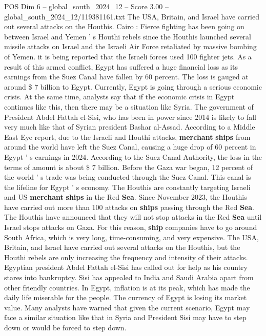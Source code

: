 \begin{textsample}{POS Dim 6 – global\_south\_2024\_12 – Score 3.00 – global\_south\_2024\_12/119381161.txt}  \label{ex:f6_pos_434}
The USA, Britain, and Israel have carried out several attacks on the Houthis.
Cairo : Fierce fighting has been going on between Israel and Yemen ' s Houthi rebels since the Houthis launched several missile attacks on Israel and the Israeli Air Force retaliated by massive bombing of Yemen. it is being reported that the Israeli forces used 100 fighter jets.
As a result of this armed conflict, Egypt has suffered a huge financial loss as its earnings from the Suez Canal have fallen by 60 percent.
The loss is gauged at around \$ 7 billion to Egypt.
Currently, Egypt is going through a serious economic crisis.
At the same time, analysts say that if the economic crisis in Egypt continues like this, then there may be a situation like Syria.
The government of President Abdel Fattah el-Sisi, who has been in power since 2014 is likely to fall very much like that of Syrian president Bashar al-Assad.
According to a Middle East Eye report, due to the Israeli and Houthi attacks, \textbf{merchant} \textbf{ships} from around the world have left the Suez Canal, causing a huge drop of 60 percent in Egypt ' s earnings in 2024.
According to the Suez Canal Authority, the loss in the terms of amount is about \$ 7 billion.
Before the Gaza war began, 12 percent of the world ' s trade was being conducted through the Suez Canal.
This canal is the lifeline for Egypt ' s economy.
The Houthis are constantly targeting Israeli and US \textbf{merchant} \textbf{ships} in the Red \textbf{Sea}.
Since November 2023, the Houthis have carried out more than 100 attacks on \textbf{ships} passing through the Red \textbf{Sea}.
The Houthis have announced that they will not stop attacks in the Red \textbf{Sea} until Israel stops attacks on Gaza.
For this reason, \textbf{ship} companies have to go around South Africa, which is very long, time-consuming, and very expensive.
The USA, Britain, and Israel have carried out several attacks on the Houthis, but the Houthi rebels are only increasing the frequency and intensity of their attacks.
Egyptian president Abdel Fattah el-Sisi has called out for help as his country stares into bankruptcy.
Sisi has appealed to India and Saudi Arabia apart from other friendly countries.
In Egypt, inflation is at its peak, which has made the daily life miserable for the people.
The currency of Egypt is losing its market value.
Many analysts have warned that given the current scenario, Egypt may face a similar situation like that in Syria and President Sisi may have to step down or would be forced to step down.

\end{textsample}
